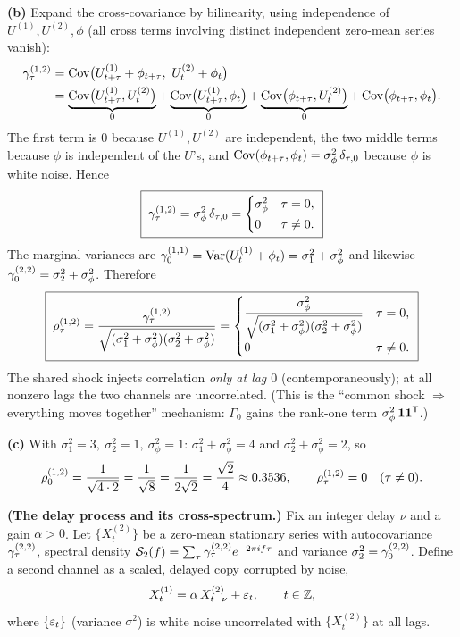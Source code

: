 \documentclass[11pt]{article}
\begin{document}
\textbf{(b)} Expand the cross-covariance by bilinearity, using independence of $U^{(1)},U^{(2)},\phi$ (all cross terms involving distinct independent zero-mean series vanish):
\[
\begin{aligned}
\acvs_\tau^{(1,2)}
&=\Cov\bigl(U_{t+\tau}^{(1)}+\phi_{t+\tau},\ U_t^{(2)}+\phi_t\bigr)\\
&=\underbrace{\Cov\bigl(U_{t+\tau}^{(1)},U_t^{(2)}\bigr)}_{0}
+\underbrace{\Cov\bigl(U_{t+\tau}^{(1)},\phi_t\bigr)}_{0}
+\underbrace{\Cov\bigl(\phi_{t+\tau},U_t^{(2)}\bigr)}_{0}
+\Cov\bigl(\phi_{t+\tau},\phi_t\bigr).
\end{aligned}
\]
The first term is $0$ because $U^{(1)},U^{(2)}$ are independent, the two middle terms because $\phi$ is independent of the $U$'s, and $\operatorname{Cov}(\phi_{t+\tau},\phi_t)=\sigma_\phi^2\,\delta_{\tau,0}$ because $\phi$ is white noise. Hence
\[
\boxed{\;\gamma_\tau^{(1,2)}=\sigma_\phi^2\,\delta_{\tau,0}
=\begin{cases}\sigma_\phi^2 & \tau=0,\\[2pt] 0 & \tau\neq0.\end{cases}\;}
\]
The marginal variances are $\gamma_0^{(1,1)}=\operatorname{Var}(U_t^{(1)}+\phi_t)=\sigma_1^2+\sigma_\phi^2$ and likewise $\gamma_0^{(2,2)}=\sigma_2^2+\sigma_\phi^2$. Therefore
\[
\boxed{\;
\rho_\tau^{(1,2)}
=\frac{\gamma_\tau^{(1,2)}}{\sqrt{(\sigma_1^2+\sigma_\phi^2)(\sigma_2^2+\sigma_\phi^2)}}
=\begin{cases}
\dfrac{\sigma_\phi^2}{\sqrt{(\sigma_1^2+\sigma_\phi^2)(\sigma_2^2+\sigma_\phi^2)}} & \tau=0,\\[12pt]
0 & \tau\neq0.
\end{cases}\;}
\]
The shared shock injects correlation \emph{only at lag $0$} (contemporaneously); at all nonzero lags the two channels are uncorrelated. (This is the ``common shock $\Rightarrow$ everything moves together'' mechanism: $\Gamma_0$ gains the rank-one term $\sigma_\phi^2\,\mathbf 1\mathbf 1^{\mathsf{T}}$.)

\textbf{(c)} With $\sigma_1^2=3,\ \sigma_2^2=1,\ \sigma_\phi^2=1$: $\sigma_1^2+\sigma_\phi^2=4$ and $\sigma_2^2+\sigma_\phi^2=2$, so
\[
\rho_0^{(1,2)}=\frac{1}{\sqrt{4\cdot2}}=\frac{1}{\sqrt8}=\frac{1}{2\sqrt2}=\frac{\sqrt2}{4}\approx0.3536,
\qquad
\rho_\tau^{(1,2)}=0\quad(\tau\neq0).
\]

\statementstart
\textbf{(The delay process and its cross-spectrum.)} Fix an integer delay $\nu$ and a gain $\alpha>0$. Let $\{X_t^{(2)}\}$ be a zero-mean stationary series with autocovariance $\gamma_\tau^{(2,2)}$, spectral density $\mathcal{S}_2(f)=\sum_\tau\gamma_\tau^{(2,2)}e^{-2\pi if\tau}$ and variance $\sigma_2^2=\gamma_0^{(2,2)}$. Define a second channel as a scaled, delayed copy corrupted by noise,
\[
X_t^{(1)}=\alpha\,X_{t-\nu}^{(2)}+\varepsilon_t ,\qquad t\in\mathbb{Z},
\]
where $\{\varepsilon_t\}$ (variance $\sigma^2$) is white noise uncorrelated with $\{X_t^{(2)}\}$ at all lags.
\end{document}
